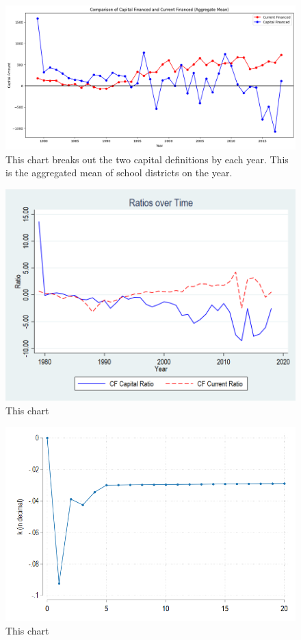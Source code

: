 
\begin{figure}[H]
    \centering
    \includegraphics[width=.75\linewidth]{_fig/comparison.png}
    \captionsetup{width=0.80\textwidth}
    \caption{\label{fig:app:four}
     This chart breaks out the two capital definitions by each year. This is the aggregated mean of school districts on the year.}
\end{figure}
\clearpage


\begin{figure}[H]
    \centering
    \includegraphics[width=.75\linewidth]{_fig/ratiobyyear.png}
    \captionsetup{width=0.80\textwidth}
    \caption{\label{fig:app:five}
     This chart }
\end{figure}
\clearpage



\begin{figure}[H]
    \centering
    \includegraphics[width=.75\linewidth]{_fig/FImpRes_k_enrollment.png}
    \captionsetup{width=0.80\textwidth}
    \caption{\label{fig:app:six}
     This chart }
\end{figure}
\clearpage

